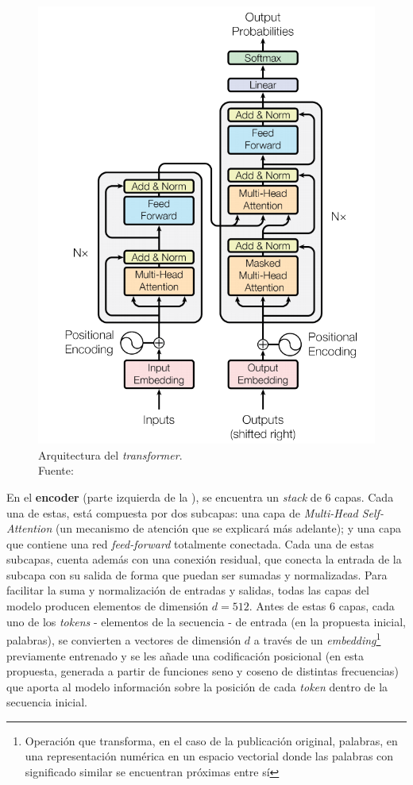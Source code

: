 \begin{figure}
\includegraphics[width=0.95\linewidth]{imagenes/transformer-arquitectura.png} 
\caption{Arquitectura del \textit{transformer}.\\Fuente: \cite{NIPS2017_3f5ee243}}
\label{fig:arquitectura-transformer}
\end{figure}

\vspace{2mm}
En el \textbf{encoder} (parte izquierda de la ), se encuentra un \textit{stack} de 6 capas. Cada una de estas, está compuesta por dos subcapas: una capa de \textit{Multi-Head Self-Attention} (un mecanismo de atención que se explicará más adelante); y una capa que contiene una red \textit{feed-forward} totalmente conectada. Cada una de estas subcapas, cuenta además con una conexión residual, que conecta la entrada de la subcapa con su salida de forma que puedan ser sumadas y normalizadas. Para facilitar la suma y normalización de entradas y salidas, todas las capas del modelo producen elementos de dimensión $d=512$. Antes de estas 6 capas, cada uno de los \textit{tokens} - elementos de la secuencia - de entrada (en la propuesta inicial, palabras), se convierten a vectores de dimensión $d$ a través de un \textit{embedding}\footnote{Operación que transforma, en el caso de la publicación original, palabras, en una representación numérica en un espacio vectorial donde las palabras con significado similar se encuentran próximas entre sí} previamente entrenado y se les añade una codificación posicional (en esta propuesta, generada a partir de funciones seno y coseno de distintas frecuencias) que aporta al modelo información sobre la posición de cada \textit{token} dentro de la secuencia inicial.

